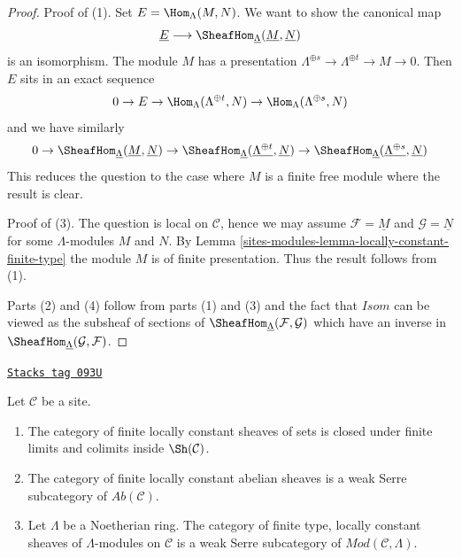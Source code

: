 \begin{proof}
Proof of (1). Set $E = \Hom_\Lambda(M, N)$. We want to show the canonical map
$$
\underline{E}
\longrightarrow
\SheafHom_{\underline{\Lambda}}(\underline{M}, \underline{N})
$$
is an isomorphism. The module $M$ has a presentation
$\Lambda^{\oplus s} \to \Lambda^{\oplus t} \to M \to 0$.
Then $E$ sits in an exact sequence
$$
0 \to E \to \Hom_\Lambda(\Lambda^{\oplus t}, N) \to
\Hom_\Lambda(\Lambda^{\oplus s}, N)
$$
and we have similarly
$$
0 \to
\SheafHom_{\underline{\Lambda}}(\underline{M}, \underline{N}) \to
\SheafHom_{\underline{\Lambda}}(\underline{\Lambda^{\oplus t}}, \underline{N})
\to
\SheafHom_{\underline{\Lambda}}(\underline{\Lambda^{\oplus s}}, \underline{N})
$$
This reduces the question to the case where $M$ is a finite free module
where the result is clear.

\medskip\noindent
Proof of (3). The question is local on $\mathcal{C}$, hence we may assume
$\mathcal{F} = \underline{M}$ and $\mathcal{G} = \underline{N}$
for some $\Lambda$-modules $M$ and $N$.
By Lemma \ref{sites-modules-lemma-locally-constant-finite-type}
the module $M$ is of finite presentation. Thus the result follows from (1).

\medskip\noindent
Parts (2) and (4) follow from parts (1) and (3) and the
fact that $\mathit{Isom}$ can be viewed as the subsheaf of sections of
$\SheafHom_{\underline{\Lambda}}(\mathcal{F}, \mathcal{G})$
which have an inverse in
$\SheafHom_{\underline{\Lambda}}(\mathcal{G}, \mathcal{F})$.
\end{proof}

\begin{lemma}
\label{sites-modules-lemma-kernel-finite-locally-constant}
\href{https://stacks.math.columbia.edu/tag/093U}{\texttt{Stacks tag 093U}}

Let $\mathcal{C}$ be a site.
\begin{enumerate}
\item The category of finite locally constant sheaves of sets
is closed under finite limits and colimits inside $\Sh(\mathcal{C})$.
\item The category of finite locally constant abelian sheaves is a
weak Serre subcategory of $\textit{Ab}(\mathcal{C})$.
\item Let $\Lambda$ be a Noetherian ring. The category of
finite type, locally constant sheaves of $\Lambda$-modules on
$\mathcal{C}$ is a weak Serre subcategory of
$\textit{Mod}(\mathcal{C}, \Lambda)$.
\end{enumerate}
\end{lemma}

